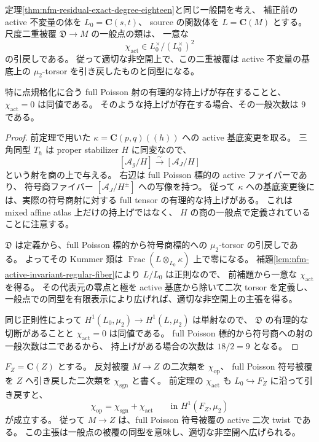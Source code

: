 \begin{theorem}
\label{thm:nfm-residual-sign-active-class}
定理\ref{thm:nfm-residual-exact-degree-eighteen}と同じ一般開を考え、
補正前の active 不変量の体を $L_0=\mathbf C(s,t)$、
source の関数体を $L=\mathbf C(M)$ とする。
尺度二重被覆 $\mathfrak D\to M$ の一般点の類は、
一意な
\[
 \chi_{\mathrm{act}}\in
 L_0^\times/(L_0^\times)^2
\]
の引戻しである。
従って適切な非空開上で、この二重被覆は active 不変量の基底上の
$\mu_2$-torsor を引き戻したものと同型になる。

特に点規格化に合う full Poisson 射の有理的な持上げが存在することと、
$\chi_{\mathrm{act}}=0$ は同値である。
そのような持上げが存在する場合、その一般次数は $9$ である。
\end{theorem}

\begin{proof}
前定理で用いた $\kappa=\mathbf C(p,q)((h))$ への active 基底変更を取る。
三角同型 $T_h$ は proper stabilizer $H$ に同変なので、
\[
 [\mathcal A_g/H]\xrightarrow{\sim}[\mathcal A_J/H]
\]
という射を商の上で与える。
右辺は full Poisson 標的の active ファイバーであり、
符号商ファイバー $[\mathcal A_J/H^\pm]$ への写像を持つ。
従って $\kappa$ への基底変更後には、実際の符号商射に対する
full tensor の有理的な持上げがある。
これは mixed affine atlas 上だけの持上げではなく、
$H$ の商の一般点で定義されていることに注意する。

$\mathfrak D$ は定義から、full Poisson 標的から符号商標的への
$\mu_2$-torsor の引戻しである。
よってその Kummer 類は
$\operatorname{Frac}(L\otimes_{L_0}\kappa)$ 上で零になる。
補題\ref{lem:nfm-active-invariant-regular-fiber}により $L/L_0$ は正則なので、
前補題から一意な $\chi_{\mathrm{act}}$ を得る。
その代表元の零点と極を active 基底から除いて二次 torsor を定義し、
一般点での同型を有限表示により広げれば、適切な非空開上の主張を得る。

同じ正則性によって $H^1(L_0,\mu_2)\to H^1(L,\mu_2)$ は単射なので、
$\mathfrak D$ の有理的な切断があることと $\chi_{\mathrm{act}}=0$ は同値である。
full Poisson 標的から符号商への射の一般次数は二であるから、
持上げがある場合の次数は $18/2=9$ となる。
\end{proof}

\begin{corollary}
\label{cor:nfm-opposite-cover-active-twist}
$F_Z=\mathbf C(Z)$ とする。
反対被覆 $M\to Z$ の二次類を $\chi_{\mathrm{op}}$、
full Poisson 符号被覆を $Z$ へ引き戻した二次類を $\chi_{\mathrm{sgn}}$ と書く。
前定理の $\chi_{\mathrm{act}}$ も $L_0\hookrightarrow F_Z$ に沿って引き戻すと、
\begin{equation}\label{eq:nfm-opposite-active-twist-class}
 \chi_{\mathrm{op}}=\chi_{\mathrm{sgn}}+\chi_{\mathrm{act}}
 \qquad\text{in }H^1(F_Z,\mu_2)
\end{equation}
が成立する。
従って $M\to Z$ は、full Poisson 符号被覆の active 二次 twist である。
この主張は一般点の被覆の同型を意味し、適切な非空開へ広げられる。
\end{corollary}

